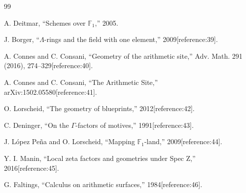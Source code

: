 \documentclass[11pt,a4paper]{article}
\begin{document}

\begin{thebibliography}{99}

 A. Deitmar, ``Schemes over $\mathbb F_1$,'' 2005.

 J. Borger, ``$\Lambda$-rings and the field with one element,'' 2009[reference:39].

 A. Connes and C. Consani, ``Geometry of the arithmetic site,'' Adv. Math. 291 (2016), 274--329[reference:40].

 A. Connes and C. Consani, ``The Arithmetic Site,'' arXiv:1502.05580[reference:41].

 O. Lorscheid, ``The geometry of blueprints,'' 2012[reference:42].

 C. Deninger, ``On the $\Gamma$-factors of motives,'' 1991[reference:43].

 J. L\'opez Pe{\~n}a and O. Lorscheid, ``Mapping $\mathbb F_1$-land,'' 2009[reference:44].

 Y. I. Manin, ``Local zeta factors and geometries under Spec Z,'' 2016[reference:45].

 G. Faltings, ``Calculus on arithmetic surfaces,'' 1984[reference:46].

\end{thebibliography}
\end{document}

